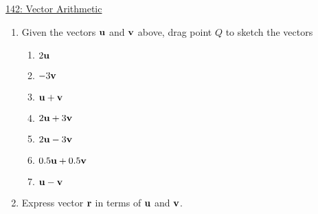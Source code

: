 \documentclass{ximera}
\begin{document}
\begin{question} \label{QLfderr33r3}

\begin{onlineOnly}
    \begin{center}
\end{center}
\end{onlineOnly}

\href{https://www.desmos.com/calculator/jg9co800dy}{142: Vector Arithmetic}

\begin{enumerate}
\item Given the vectors ${\bf u}$ and ${\bf v}$ above, drag point $Q$ to sketch the vectors

\begin{enumerate}
\item $2{\bf u}$

\item $-3{\bf v}$

\item ${\bf u} + {\bf v}$

\item $2{\bf u} + 3{\bf v}$

\item $2{\bf u} - 3{\bf v}$

\item $0.5{\bf u} + 0.5{\bf v}$

\item ${\bf  u} - {\bf v}$

\end{enumerate}

\item Express vector ${\bf r}$ in terms of ${\bf u}$ and ${\bf v}$.

\end{enumerate}
\end{question}
\end{document}
